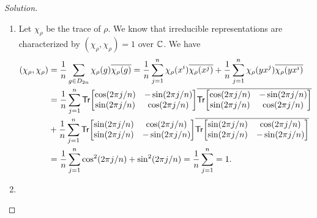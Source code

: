 \begin{proof}[Solution]
\begin{enumerate}[font=\normalfont,label=\textbf{(\alph*)}, wide]
\[\begin{aligned}
\begin{bmatrix}
-\sin(2\pi/n) & \cos(2\pi/n) \\
\cos(2\pi/n) & \sin(2\pi/n)
\end{bmatrix}
\begin{bmatrix}
\cos(2\pi/n) & -\sin(2\pi/n) \\
\sin(2\pi/n) & \cos(2\pi/n)
\end{bmatrix}
\\
&=
\begin{bmatrix}
\cos^2(2\pi/n) + \sin^2(2\pi/n) & 0 \\
0 & \cos^2(2\pi/n) + \sin^2(2\pi/n)
\end{bmatrix}
\\
&=
\begin{bmatrix}
1 & 0 \\
0 & 1
\end{bmatrix}
.
\end{aligned}
\]
The first relation $\rho(x)^n = 1$ is indeed in one-to-one correspondence with the relation $x^n = 1$ since $n$ is the smallest non-negative integer $k$ such that $\cos(2\pi k/n), \sin(2\pi k/n) = 1, 0$ respectively which implies that $\rho(x)^k \neq 1$ for $k < n$.

\item Let $\chi_\rho$ be the trace of $\rho$. We know that irreducible representations are characterized by $(\chi_\rho, \chi_\rho) = 1$ over $\mathbb{C}$. We have
\[
\begin{aligned}
(\chi_\rho, \chi_\rho) &= \frac{1}{n}\sum_{g \in D_{2n}}  \chi_\rho(g)\overline{\chi_\rho(g)} = \frac{1}{n}\sum_{j = 1}^n  \chi_\rho(x^i)\overline{\chi_\rho(x^j)} + \frac{1}{n}\sum_{j = 1}^n  \chi_\rho(yx^j)\overline{\chi_\rho(yx^i)} \\
&= \frac{1}{n}\sum_{j = 1}^n
\mathsf{Tr}{
\begin{bmatrix}
\cos(2\pi j/n) & -\sin(2\pi j/n) \\
\sin(2\pi j/n) & \cos(2\pi j/n)
\end{bmatrix}
}
\overline{
\mathsf{Tr}{
\begin{bmatrix}
\cos(2\pi j/n) & -\sin(2\pi j/n) \\
\sin(2\pi j/n) & \cos(2\pi j/n)
\end{bmatrix}
}
} \\
&+
\frac{1}{n}\sum_{j = 1}^n
\mathsf{Tr}{
\begin{bmatrix}
\sin(2\pi j/n) & \cos(2\pi j/n) \\
\sin(2\pi j/n) & -\sin(2\pi j/n)
\end{bmatrix}
}
\overline{
\mathsf{Tr}{
\begin{bmatrix}
\sin(2\pi j/n) & \cos(2\pi j/n) \\
\sin(2\pi j/n) & -\sin(2\pi j/n)
\end{bmatrix}
}
} \\
&= \frac{1}{n} \sum_{j = 1}^n \cos^2(2\pi j/n) + \sin^2(2\pi j/n) = \frac{1}{n} \sum_{j = 1}^n = 1.
\end{aligned}
\]

\item
\end{enumerate}
\end{proof}


